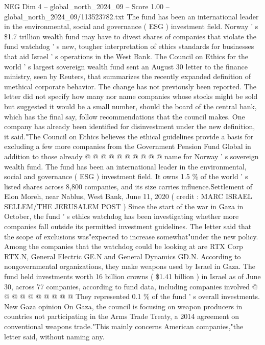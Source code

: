 \begin{textsample}{NEG Dim 4 – global\_north\_2024\_09 – Score 1.00 – global\_north\_2024\_09/113523782.txt}  \label{ex:f4_neg_150}
The fund has been an international leader in the environmental, social and governance ( ESG ) investment field.
Norway ' s \$1.7 trillion wealth fund may have to divest shares of companies that violate the fund watchdog ' s new, tougher interpretation of ethics standards for businesses that aid Israel ' s operations in the West Bank.
The Council on Ethics for the world ' s largest sovereign wealth fund sent an August 30 letter to the finance ministry, seen by Reuters, that summarizes the recently expanded definition of unethical corporate behavior.
The change has not previously been reported.
The letter did not specify how many nor name companies whose stocks might be sold but suggested it would be a small number, should the board of the central bank, which has the final say, follow recommendations that the council makes.
One company has already been identified for disinvestment under the new definition, it said."The Council on Ethics believes the ethical guidelines provide a basis for excluding a few more companies from the Government Pension Fund Global in addition to those already @ @ @ @ @ @ @ @ @ @ name for Norway ' s sovereign wealth fund.
The fund has been an international leader in the environmental, social and governance ( ESG ) investment field.
It owns 1.5 \% of the world ' s listed shares across 8,800 companies, and its size carries influence.Settlement of Elon Moreh, near Nablus, West Bank, June 11, 2020 ( credit : MARC ISRAEL SELLEM/THE JERUSALEM POST ) Since the start of the war in Gaza in October, the fund ' s ethics watchdog has been investigating whether more companies fall outside its permitted investment guidelines.
The letter said that the scope of exclusions was"expected to increase somewhat"under the new policy.
Among the companies that the watchdog could be looking at are RTX Corp RTX.N, General Electric GE.N and General Dynamics GD.N.
According to nongovernmental organizations, they make weapons used by Israel in Gaza.
The fund held investments worth 16 billion crowns ( \$1.41 billion ) in Israel as of June 30, across 77 companies, according to fund data, including companies involved @ @ @ @ @ @ @ @ @ @ They represented 0.1 \% of the fund ' s overall investments.
New Gaza opinion On Gaza, the council is focusing on weapon producers in countries not participating in the Arms Trade Treaty, a 2014 agreement on conventional weapons trade."This mainly concerns American companies,"the letter said, without naming any.

\end{textsample}
